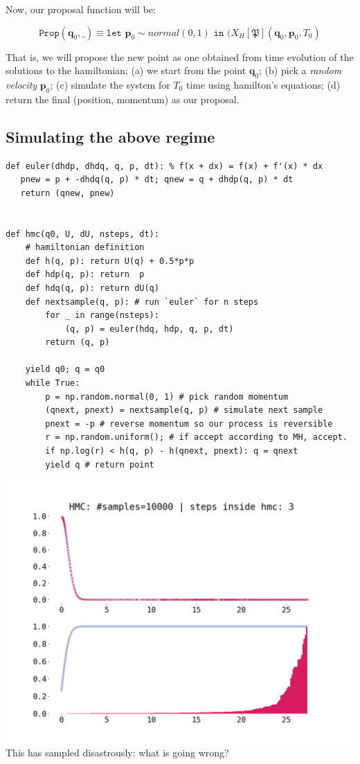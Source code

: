 \documentclass[titlepage]{article}
\newcommand{\p}{\mathbf{p}}
\newcommand{\q}{\mathbf{q}}
\renewcommand{\P}{\mathfrak{P}}
\newcommand{\Prop}{\texttt{Prop}}
\begin{document}
Now, our proposal function will be:

$$
\Prop(\q_0, \_) \equiv \texttt{let } \p_0 \sim normal(0, 1) \texttt{ in } (X_H[\P](\q_0, \p_0, T_0)
$$

That is, we will  propose the new point as one obtained
from time evolution of the solutions to the hamiltonian; (a) we start from the
point $\q_0$; (b) pick a \emph{random velocity} $\p_0$; (c) simulate the
system for $T_0$ time using hamilton's equations; (d) return the final (position, momentum) as our proposal.

\subsection{Simulating the above regime}

\begin{verbatim}
def euler(dhdp, dhdq, q, p, dt): % f(x + dx) = f(x) + f'(x) * dx
   pnew = p + -dhdq(q, p) * dt; qnew = q + dhdp(q, p) * dt
   return (qnew, pnew)


def hmc(q0, U, dU, nsteps, dt):
    # hamiltonian definition
    def h(q, p): return U(q) + 0.5*p*p
    def hdp(q, p): return  p
    def hdq(q, p): return dU(q)
    def nextsample(q, p): # run `euler` for n steps
        for _ in range(nsteps):
            (q, p) = euler(hdq, hdp, q, p, dt)
        return (q, p)

    yield q0; q = q0
    while True:
        p = np.random.normal(0, 1) # pick random momentum
        (qnext, pnext) = nextsample(q, p) # simulate next sample
        pnext = -p # reverse momentum so our process is reversible
        r = np.random.uniform(); # if accept according to MH, accept.
        if np.log(r) < h(q, p) - h(qnext, pnext): q = qnext
        yield q # return point
\end{verbatim}

\includegraphics[width=\textwidth]{mcmc-hmc-WRONG-euler-1d-exp.png}
This has sampled disastrously: what is going wrong?
\end{document}

